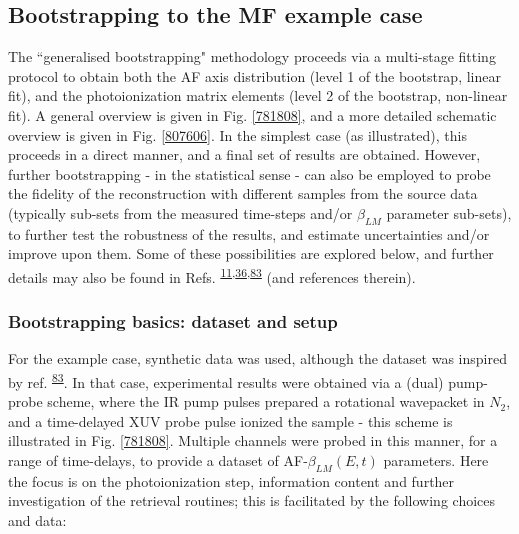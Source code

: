 \documentclass[10pt]{article}
\begin{document}
\subsection{Bootstrapping to the MF example case\label{sec:bootstrapping}}


The ``generalised bootstrapping" methodology proceeds via a multi-stage fitting protocol to obtain both the AF axis distribution (level 1 of the bootstrap, linear fit), and the photoionization matrix elements (level 2 of the bootstrap, non-linear fit). A general overview is given in Fig. \ref{781808}, and a more detailed schematic overview is given in Fig. \ref{807606}. In the simplest case (as illustrated), this proceeds in a direct manner, and a final set of results are obtained. However, further bootstrapping - in the statistical sense - can also be employed to probe the fidelity of the reconstruction with different samples from the source data (typically sub-sets from the measured time-steps and/or $\beta_{LM}$ parameter sub-sets), to further test the robustness of the results, and estimate uncertainties and/or improve upon them. Some of these possibilities are explored below, and further details may also be found in Refs. \textsuperscript{\hyperref[csl:11]{11},\hyperref[csl:36]{36},\hyperref[csl:83]{83}} (and references therein).






\subsubsection{Bootstrapping basics: dataset and setup}

For the example case, synthetic data was used, although the dataset was inspired by ref. \textsuperscript{\hyperref[csl:83]{83}}. In that case, experimental results were obtained via a (dual) pump-probe scheme, where the IR pump pulses prepared a rotational wavepacket in $N_2$, and a time-delayed XUV probe pulse ionized the sample - this scheme is illustrated in Fig. \ref{781808}. Multiple channels were probed in this manner, for a range of time-delays, to provide a dataset of AF-$\beta_{LM}(E,t)$ parameters. Here the focus is on the photoionization step, information content and further investigation of the retrieval routines; this is facilitated by the following choices and data:
\end{document}
